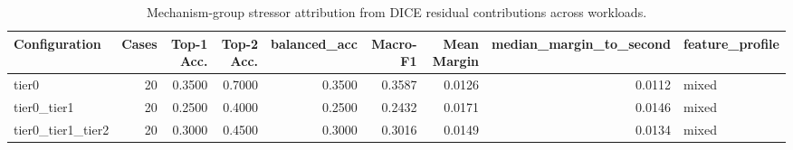 \begin{table}[t]
\centering
\caption{Mechanism-group stressor attribution from DICE residual contributions across workloads.}
\label{tab:dice_stressor_diagnosis}
\footnotesize
\begin{tabular}{lrrrrrrrl}
\toprule
Configuration & Cases & Top-1 Acc. & Top-2 Acc. & balanced_acc & Macro-F1 & Mean Margin & median_margin_to_second & feature_profile \\
\midrule
tier0 & 20 & 0.3500 & 0.7000 & 0.3500 & 0.3587 & 0.0126 & 0.0112 & mixed \\
tier0_tier1 & 20 & 0.2500 & 0.4000 & 0.2500 & 0.2432 & 0.0171 & 0.0146 & mixed \\
tier0_tier1_tier2 & 20 & 0.3000 & 0.4500 & 0.3000 & 0.3016 & 0.0149 & 0.0134 & mixed \\
\bottomrule
\end{tabular}

\end{table}
